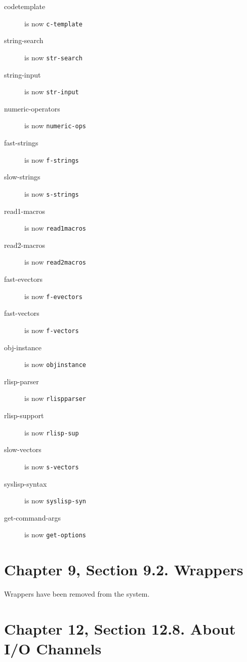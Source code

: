 \begin{description}

\item[codetemplate] is now {\tt c-template}

\item[string-search] is now {\tt str-search}

\item[string-input] is now {\tt str-input}

\item[numeric-operators] is now {\tt numeric-ops}

\item[fast-strings] is now {\tt f-strings}

\item[slow-strings] is now {\tt s-strings}

\item[read1-macros] is now {\tt read1macros}

\item[read2-macros] is now {\tt read2macros}

\item[fast-evectors] is now {\tt f-evectors}

\item[fast-vectors] is now {\tt f-vectors}

\item[obj-instance] is now {\tt objinstance}

\item[rlisp-parser] is now {\tt rlispparser}

\item[rlisp-support] is now {\tt rlisp-sup}

\item[slow-vectors] is now {\tt s-vectors}

\item[syslisp-syntax] is now {\tt syslisp-syn}

\item[get-command-args] is now {\tt get-options}

\end{description}

\section{Chapter 9, Section 9.2.  Wrappers}

Wrappers have been removed from the system.

\section{Chapter 12, Section 12.8.  About I/O Channels}

